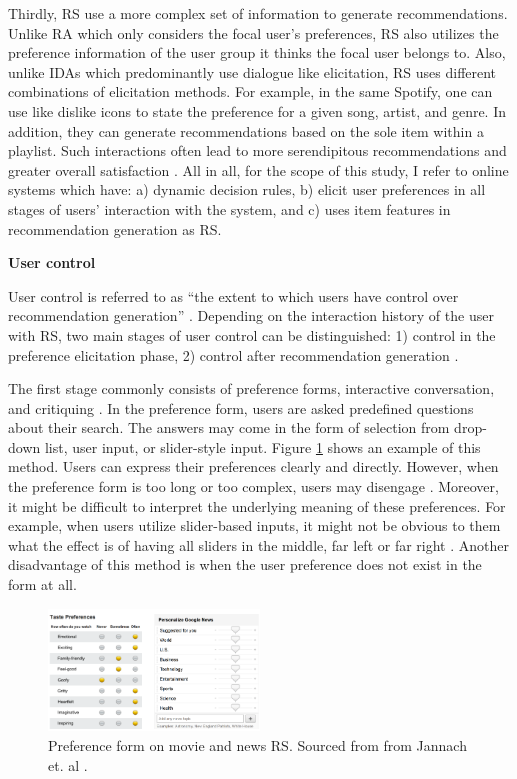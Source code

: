 \documentclass[a4paper,12pt]{article}
\newcommand{\citeyearonly}[1]{\citeyearpar{#1}}
\begin{document}
Thirdly, RS use a more complex set of information to generate recommendations. Unlike RA which only considers the focal user's preferences, RS also utilizes the preference information of the user group it thinks the focal user belongs to. Also, unlike IDAs which predominantly use dialogue like elicitation, RS uses different combinations of elicitation methods. For example, in the same Spotify, one can use like dislike icons to state the preference for a given song, artist, and genre. In addition, they can generate recommendations based on the sole item within a playlist. Such interactions often lead to more serendipitous recommendations and greater overall satisfaction \citep{kotkovSurveySerendipityRecommender2016}. All in all, for the scope of this study, I refer to online systems which have: a) dynamic decision rules, b) elicit user preferences in all stages of users' interaction with the system, and c) uses item features in recommendation generation as RS.

\textbf{User control}

User control is referred to as ``the extent to which users have control over recommendation generation'' \citep{knijnenburgExplainingUserExperience2012}. Depending on the interaction history of the user with RS, two main stages of user control can be distinguished: 1) control in the preference elicitation phase, 2) control after recommendation generation \citep{jannach2017user}.

The first stage commonly consists of preference forms, interactive conversation, and critiquing \citep{jannach2019explanations}. In the preference form, users are asked predefined questions about their search. The answers may come in the form of selection from drop-down list, user input, or slider-style input. Figure \ref{fig:preference} shows an example of this method. Users can express their preferences clearly and directly.  However, when the preference form is too long or too complex, users may disengage \citep{jannach2017user}. Moreover, it might be difficult to interpret the underlying meaning of these preferences. For example, when users utilize slider-based inputs, it might not be obvious to them what the effect is of having all sliders in the middle, far left or far right \citep{jannach2017user}. Another disadvantage of this method is when the user preference does not exist in the form at all.

\begin{figure}[H]
    \centering
    \includegraphics[width=0.5\textwidth]{staticFiles/preferenceForm.png}
    \caption[Preference form in RS]{Preference form on movie and news RS. Sourced from from Jannach et. al \citeyearonly{jannach2017user}.}
    \label{fig:preference}
\end{figure}
\end{document}
